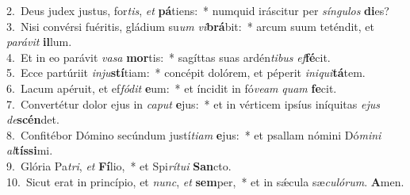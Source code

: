 {2.~}Deus judex justus, for\textit{tis}, \textit{et} \textbf{pá}tiens:~* numquid iráscitur per \textit{sín}\textit{gu}\textit{los} \textbf{di}es?\\
{3.~}Nisi convérsi fuéritis, gládium su\textit{um} \textit{vi}\textbf{brá}bit:~* arcum suum teténdit, et \textit{pa}\textit{rá}\textit{vit} \textbf{il}lum.\\
{4.~}Et in eo parávit \textit{va}\textit{sa} \textbf{mor}tis:~* sagíttas suas ardén\textit{ti}\textit{bus} \textit{ef}\textbf{fé}cit.\\
{5.~}Ecce partúriit \textit{in}\textit{ju}\textbf{stí}tiam:~* concépit dolórem, et péperit \textit{i}\textit{ni}\textit{qui}\textbf{tá}tem.\\
{6.~}Lacum apéruit, et ef\textit{fó}\textit{dit} \textbf{e}um:~* et íncidit in fó\textit{ve}\textit{am} \textit{quam} \textbf{fe}cit.\\
{7.~}Convertétur dolor ejus in \textit{ca}\textit{put} \textbf{e}jus:~* et in vérticem ipsíus iníquitas \textit{e}\textit{jus} \textit{de}\textbf{scén}det.\\
{8.~}Confitébor Dómino secúndum justí\textit{ti}\textit{am} \textbf{e}jus:~* et psallam nómini Dó\textit{mi}\textit{ni} \textit{al}\textbf{tís}\textbf{si}mi.\\
{9.~}Glória Pa\textit{tri}, \textit{et} \textbf{Fí}lio,~* et Spi\textit{rí}\textit{tu}\textit{i} \textbf{San}cto.\\
{10.~}Sicut erat in princípio, et \textit{nunc}, \textit{et} \textbf{sem}per,~* et in sǽcula sæ\textit{cu}\textit{ló}\textit{rum}. \textbf{A}men.\\
